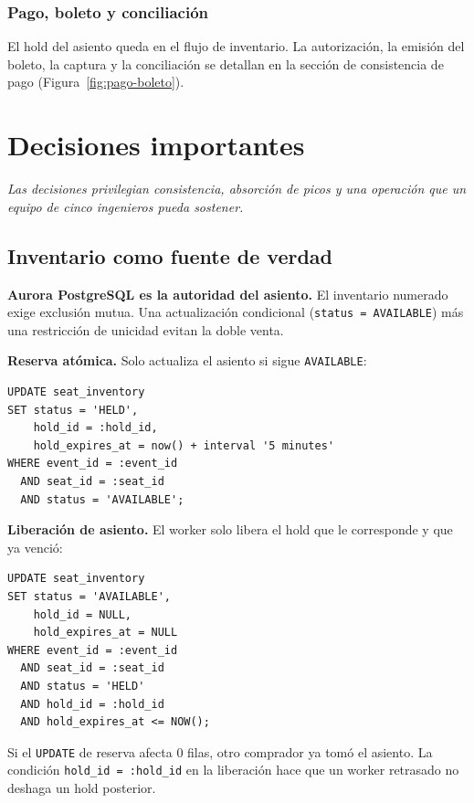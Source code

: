 \documentclass[11pt,a4paper]{article}
\newcommand{\sectionintro}[1]{\vspace{-0.15em}\textit{\textcolor{livetixgray}{#1}}\par\vspace{0.45em}}
\newcommand{\decision}[2]{\textbf{#1.} #2}
\begin{document}
\subsubsection{Pago, boleto y conciliación}

El hold del asiento queda en el flujo de inventario. La autorización, la emisión del boleto, la captura y la conciliación se detallan en la sección de consistencia de pago (Figura~\ref{fig:pago-boleto}).

\section{Decisiones importantes}

\sectionintro{Las decisiones privilegian consistencia, absorción de picos y una operación que un equipo de cinco ingenieros pueda sostener.}

\subsection{Inventario como fuente de verdad}

\decision{Aurora PostgreSQL es la autoridad del asiento}{El inventario numerado exige exclusión mutua. Una actualización condicional (\texttt{status = AVAILABLE}) más una restricción de unicidad evitan la doble venta.}

\textbf{Reserva atómica.} Solo actualiza el asiento si sigue \texttt{AVAILABLE}:

\begin{lstlisting}[style=livetixsql]
UPDATE seat_inventory
SET status = 'HELD',
    hold_id = :hold_id,
    hold_expires_at = now() + interval '5 minutes'
WHERE event_id = :event_id
  AND seat_id = :seat_id
  AND status = 'AVAILABLE';
\end{lstlisting}

\textbf{Liberación de asiento.} El worker solo libera el hold que le corresponde y que ya venció:

\begin{lstlisting}[style=livetixsql]
UPDATE seat_inventory
SET status = 'AVAILABLE',
    hold_id = NULL,
    hold_expires_at = NULL
WHERE event_id = :event_id
  AND seat_id = :seat_id
  AND status = 'HELD'
  AND hold_id = :hold_id
  AND hold_expires_at <= NOW();
\end{lstlisting}

Si el \texttt{UPDATE} de reserva afecta 0 filas, otro comprador ya tomó el asiento. La condición \texttt{hold\_id = :hold\_id} en la liberación hace que un worker retrasado no deshaga un hold posterior.
\end{document}
